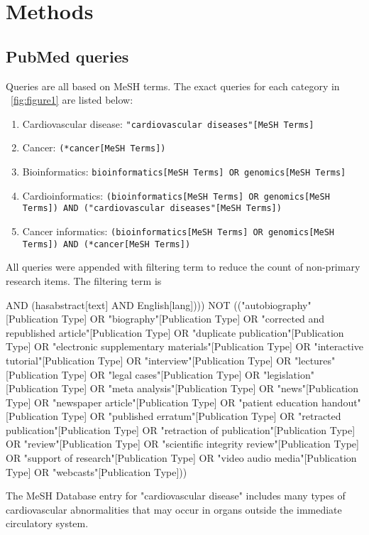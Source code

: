 \documentclass[letter]{bib}
\begin{document}
\section*{Methods}
\begin{methods}
    \subsection*{PubMed queries}
    Queries are all based on MeSH terms. The exact queries for each category in \figurename~\ref{fig:figure1} are listed below:
    \begin{enumerate}
    	\item Cardiovascular disease: \texttt{"cardiovascular diseases"[MeSH Terms]}
    	\item Cancer: \texttt{(*cancer[MeSH Terms])}
    	\item Bioinformatics: \texttt{bioinformatics[MeSH Terms] OR genomics[MeSH Terms]}
    	\item Cardioinformatics: \texttt{(bioinformatics[MeSH Terms] OR genomics[MeSH Terms]) AND ("cardiovascular diseases"[MeSH Terms])}
    	\item Cancer informatics: \texttt{(bioinformatics[MeSH Terms] OR genomics[MeSH Terms]) AND (*cancer[MeSH Terms])}
    \end{enumerate}
	
	All queries were appended with filtering term to reduce the count of non-primary research items. The filtering term is
	
	{
	AND (hasabstract[text] AND English[lang]))) NOT (("autobiography"[Publication Type] OR "biography"[Publication Type] OR "corrected and republished article"[Publication Type] OR "duplicate publication"[Publication Type] OR "electronic supplementary materials"[Publication Type] OR "interactive tutorial"[Publication Type] OR "interview"[Publication Type] OR "lectures"[Publication Type] OR "legal cases"[Publication Type] OR "legislation"[Publication Type] OR "meta analysis"[Publication Type] OR "news"[Publication Type] OR "newspaper article"[Publication Type] OR "patient education handout"[Publication Type] OR "published erratum"[Publication Type] OR "retracted publication"[Publication Type] OR "retraction of publication"[Publication Type] OR "review"[Publication Type] OR "scientific integrity review"[Publication Type] OR "support of research"[Publication Type] OR "video audio media"[Publication Type] OR "webcasts"[Publication Type]))
}

    The MeSH Database entry for "cardiovascular disease" includes many types of cardiovascular abnormalities that may occur in organs outside the immediate circulatory system.
    

\end{methods}
\end{document}
